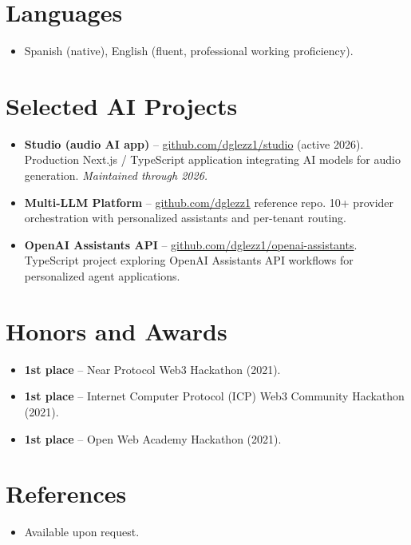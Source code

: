 \documentclass[11pt,a4paper,sans]{moderncv}
\begin{document}

\section{Languages}
\vspace{1pt}
\begin{itemize}
\item Spanish (native), English (fluent, professional working proficiency).
\end{itemize}


\section{Selected AI Projects}
\vspace{1pt}
\begin{itemize}
\item{\textbf{Studio (audio AI app)} -- \href{https://github.com/dglezz1/studio}{github.com/dglezz1/studio} (active 2026). Production Next.js / TypeScript application integrating AI models for audio generation. \emph{Maintained through 2026.}}
\item{\textbf{Multi-LLM Platform} -- \href{https://github.com/dglezz1}{github.com/dglezz1} reference repo. 10+ provider orchestration with personalized assistants and per-tenant routing.}
\item{\textbf{OpenAI Assistants API} -- \href{https://github.com/dglezz1/openai-assistants}{github.com/dglezz1/openai-assistants}. TypeScript project exploring OpenAI Assistants API workflows for personalized agent applications.}
\end{itemize}


\section{Honors and Awards}
\vspace{1pt}
\begin{itemize}
\item{\textbf{1st place} -- Near Protocol Web3 Hackathon (2021).}
\item{\textbf{1st place} -- Internet Computer Protocol (ICP) Web3 Community Hackathon (2021).}
\item{\textbf{1st place} -- Open Web Academy Hackathon (2021).}
\end{itemize}


\section{References}
\vspace{1pt}
\begin{itemize}
\item{Available upon request.}
\end{itemize}
\end{document}
